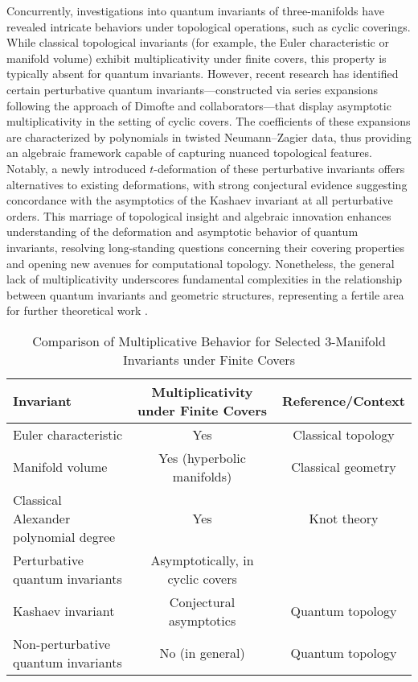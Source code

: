 \documentclass[11pt]{article}
\begin{document}
Concurrently, investigations into quantum invariants of three-manifolds have revealed intricate behaviors under topological operations, such as cyclic coverings. While classical topological invariants (for example, the Euler characteristic or manifold volume) exhibit multiplicativity under finite covers, this property is typically absent for quantum invariants. However, recent research has identified certain perturbative quantum invariants—constructed via series expansions following the approach of Dimofte and collaborators—that display asymptotic multiplicativity in the setting of cyclic covers. The coefficients of these expansions are characterized by polynomials in twisted Neumann–Zagier data, thus providing an algebraic framework capable of capturing nuanced topological features. Notably, a newly introduced $t$-deformation of these perturbative invariants offers alternatives to existing deformations, with strong conjectural evidence suggesting concordance with the asymptotics of the Kashaev invariant at all perturbative orders. This marriage of topological insight and algebraic innovation enhances understanding of the deformation and asymptotic behavior of quantum invariants, resolving long-standing questions concerning their covering properties and opening new avenues for computational topology. Nonetheless, the general lack of multiplicativity underscores fundamental complexities in the relationship between quantum invariants and geometric structures, representing a fertile area for further theoretical work \cite{ref89}.

\begin{table}[h!]
\centering
\caption{Comparison of Multiplicative Behavior for Selected 3-Manifold Invariants under Finite Covers}
\label{tab:covering_invariants}
\begin{tabular}{|l|c|c|}
\hline
\textbf{Invariant} & \textbf{Multiplicativity under Finite Covers} & \textbf{Reference/Context} \\
\hline
Euler characteristic & Yes & Classical topology \\
Manifold volume & Yes (hyperbolic manifolds) & Classical geometry \\
Classical Alexander polynomial degree & Yes & Knot theory \\
Perturbative quantum invariants & Asymptotically, in cyclic covers & \cite{ref89} \\
Kashaev invariant & Conjectural asymptotics & Quantum topology \\
Non-perturbative quantum invariants & No (in general) & Quantum topology \\
\hline
\end{tabular}
\end{table}
\end{document}
